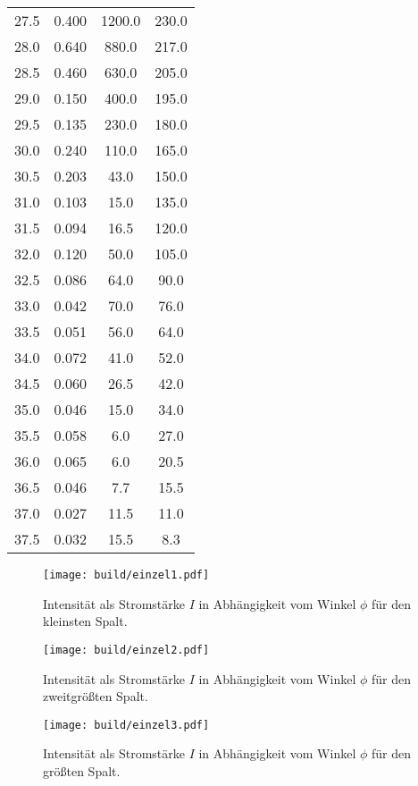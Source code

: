 \begin{table}
{\begin{tabular}{S S S S}
27.5 & 0.400 & 1200.0 & 230.0 \\
28.0 & 0.640 & 880.0 & 217.0 \\
28.5 & 0.460 & 630.0 & 205.0 \\
29.0 & 0.150 & 400.0 & 195.0 \\
29.5 & 0.135 & 230.0 & 180.0 \\
30.0 & 0.240 & 110.0 & 165.0 \\
30.5 & 0.203 & 43.0 & 150.0 \\
31.0 & 0.103 & 15.0 & 135.0 \\
31.5 & 0.094 & 16.5 & 120.0 \\
32.0 & 0.120 & 50.0 & 105.0 \\
32.5 & 0.086 & 64.0 & 90.0 \\
33.0 & 0.042 & 70.0 & 76.0\\
33.5 & 0.051 & 56.0 & 64.0 \\
34.0 & 0.072 & 41.0 & 52.0 \\
34.5 & 0.060 & 26.5 & 42.0 \\
35.0 & 0.046 & 15.0 & 34.0 \\
35.5 & 0.058 & 6.0 & 27.0 \\
36.0 & 0.065 & 6.0  & 20.5 \\
36.5 & 0.046 & 7.7  & 15.5 \\
37.0 & 0.027 & 11.5 & 11.0 \\
37.5 & 0.032 & 15.5 & 8.3 \\
\bottomrule
\end{tabular}}
\end{table}

\begin{figure}
  \centering
  \texttt{[image: build/einzel1.pdf]}
  \caption{Intensität als Stromstärke $I$ in Abhängigkeit vom Winkel $\phi$ für den kleinsten Spalt.}
  \label{fig:einzel1}
\end{figure}

\begin{figure}
  \centering
  \texttt{[image: build/einzel2.pdf]}
  \caption{Intensität als Stromstärke $I$ in Abhängigkeit vom Winkel $\phi$ für den zweitgrößten Spalt.}
  \label{fig:einzel2}
\end{figure}

\begin{figure}
  \centering
  \texttt{[image: build/einzel3.pdf]}
  \caption{Intensität als Stromstärke $I$ in Abhängigkeit vom Winkel $\phi$ für den größten Spalt.}
  \label{fig:einzel3}
\end{figure}

